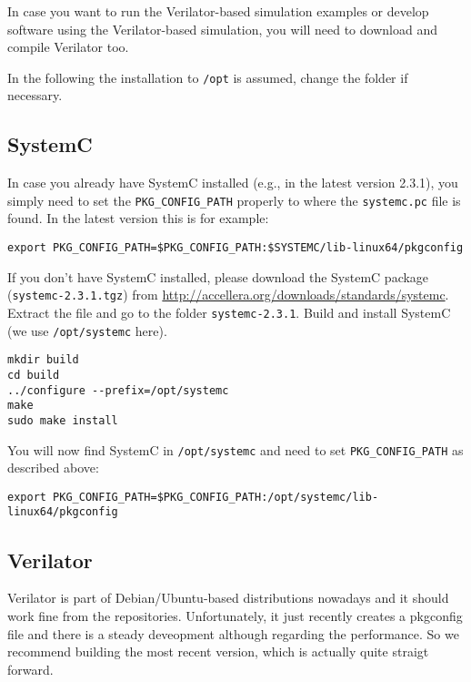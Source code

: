 In case you want to run the Verilator-based simulation examples or
develop software using the Verilator-based simulation, you will need
to download and compile Verilator too.

In the following the installation to \verb|/opt| is assumed, change
the folder if necessary.

\subsection{SystemC}

In case you already have SystemC installed (e.g., in the latest
version 2.3.1), you simply need to set the \verb|PKG_CONFIG_PATH|
properly to where the \verb|systemc.pc| file is found. In the latest
version this is for example:

\begin{lstlisting}
export PKG_CONFIG_PATH=$PKG_CONFIG_PATH:$SYSTEMC/lib-linux64/pkgconfig
\end{lstlisting}

If you don't have SystemC installed, please download the SystemC
package (\verb|systemc-2.3.1.tgz|) from
\url{http://accellera.org/downloads/standards/systemc}. Extract the
file and go to the folder \texttt{systemc-2.3.1}. Build and install
SystemC (we use \texttt{/opt/systemc} here).

\begin{lstlisting}
mkdir build
cd build
../configure --prefix=/opt/systemc
make
sudo make install
\end{lstlisting}

You will now find SystemC in \verb|/opt/systemc| and need to set
\verb|PKG_CONFIG_PATH| as described above:

\begin{lstlisting}
export PKG_CONFIG_PATH=$PKG_CONFIG_PATH:/opt/systemc/lib-linux64/pkgconfig
\end{lstlisting}

\subsection{Verilator}

Verilator is part of Debian/Ubuntu-based distributions nowadays and it
should work fine from the repositories. Unfortunately, it just
recently creates a pkgconfig file and there is a steady deveopment
although regarding the performance. So we recommend building the most
recent version, which is actually quite straigt forward.

